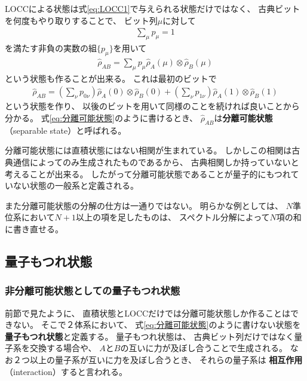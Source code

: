 \documentclass[a4paper, 10pt]{jsarticle}
\begin{document}
LOCCによる状態は式\eqref{eq:LOCC1}で与えられる状態だけではなく、
古典ビットを何度もやり取りすることで、
ビット列$\mu$に対して
\begin{align}
	\sum_\mu p_\mu = 1
\end{align}
を満たす非負の実数の組$\{ p_\mu \}$を用いて
\begin{align}
	\hat{\rho}_{AB}
	= \sum_\mu p_\mu \hat{\rho}_A (\mu) \otimes \hat{\rho}_B (\mu)
	\label{eq:分離可能状態}
\end{align}
という状態も作ることが出来る。
これは最初のビットで
\begin{align}
	\hat{\rho}_{AB}=
	\left( \sum_\nu p_{0\nu} \right)
	\hat{\rho}_A (0) \otimes \hat{\rho}_B (0)
	+ \left( \sum_\nu p_{1\nu} \right)
	\hat{\rho}_A (1) \otimes \hat{\rho}_B (1)
\end{align}
という状態を作り、
以後のビットを用いて同様のことを続ければ良いことから分かる。
式\eqref{eq:分離可能状態}のように書けるとき、
$\hat{\rho}_{AB}$は\textbf{分離可能状態}（separable state）と呼ばれる。

分離可能状態には直積状態にはない相関が生まれている。
しかしこの相関は古典通信によってのみ生成されたものであるから、
古典相関しか持っていないと考えることが出来る。
したがって分離可能状態であることが量子的にもつれていない状態の一般系と定義される。

また分離可能状態の分解の仕方は一通りではない。
明らかな例としては、
$N$準位系において$N+1$以上の項を足したものは、
スペクトル分解によって$N$項の和に書き直せる。

\subsection{量子もつれ状態}
\subsubsection{非分離可能状態としての量子もつれ状態}
前節で見たように、
直積状態とLOCCだけでは分離可能状態しか作ることはできない。
そこで２体系において、
式\eqref{eq:分離可能状態}のように書けない状態を
\textbf{量子もつれ状態}と定義する。
量子もつれ状態は、
古典ビット列だけではなく量子系を交換する場合や、
$A$と$B$の互いに力が及ぼし合うことで生成される。
なお２つ以上の量子系が互いに力を及ぼし合うとき、
それらの量子系は
\textbf{相互作用}（interaction）すると言われる。
\end{document}
